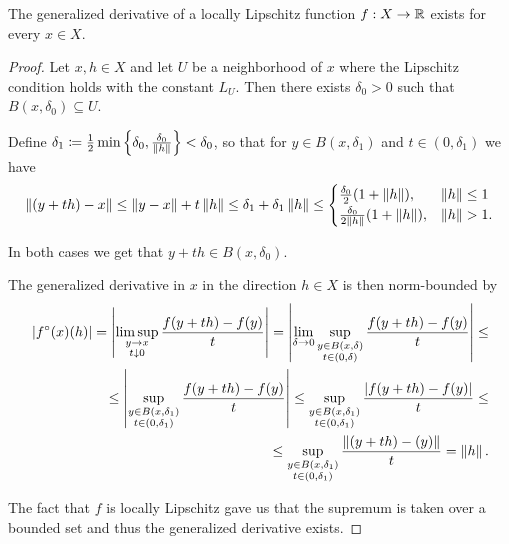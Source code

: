 \begin{proposition}\label{thm:clarke_derivative_exists}
  The generalized derivative of a locally Lipschitz function $f: X \to \mathbb{R}$ exists for every $x \in X$.
\end{proposition}
\begin{proof}
  Let $x, h \in X$ and let $U$ be a neighborhood of $x$ where the Lipschitz condition holds with the constant $L_U$. Then there exists $\delta_0 > 0$ such that $B(x, \delta_0) \subseteq U$.

  Define $\delta_1 \coloneqq \frac 1 2 \min \left\{\delta_0, \frac {\delta_0} {\left\Vert h \right\Vert} \right\} < \delta_0$, so that for $y \in B(x, \delta_1)$ and $t \in (0, \delta_1)$ we have
  \begin{align*}
    \left\Vert (y + th) - x \right\Vert
    \leq
    \left\Vert y - x \right\Vert + t \left\Vert h \right\Vert
    \leq
    \delta_1 + \delta_1 \left\Vert h \right\Vert
    \leq
    \begin{cases}
      \frac {\delta_0} 2 (1 + \left\Vert h \right\Vert), &\left\Vert h \right\Vert \leq 1 \\
      \frac {\delta_0} {2 \left\Vert h \right\Vert} (1 + \left\Vert h \right\Vert), &\left\Vert h \right\Vert > 1.
    \end{cases}
  \end{align*}

  In both cases we get that $y + th \in B(x, \delta_0)$.

  The generalized derivative in $x$ in the direction $h \in X$ is then norm-bounded by
  \begin{align*}
    \left\vert f^\circ(x)(h) \right\vert
    =
    \left\vert \limsup_{\substack{y \to x \\ t \downarrow 0}} \frac {f(y + th) - f(y)} t \right\vert
    =
    \left\vert \lim_{\delta \to 0} \sup_{\substack{y \in B(x, \delta) \\ t \in (0, \delta)}} \frac {f(y + th) - f(y)} t \right\vert
    \leq \\ \leq
    \left\vert \sup_{\substack{y \in B(x, \delta_1) \\ t \in (0, \delta_1)}} \frac {f(y + th) - f(y)} t \right\vert
    \leq
    \sup_{\substack{y \in B(x, \delta_1) \\ t \in (0, \delta_1)}} \frac {\left\vert f(y + th) - f(y) \right\vert} t
    \leq \\ \leq
    \sup_{\substack{y \in B(x, \delta_1) \\ t \in (0, \delta_1)}} \frac {\left\Vert (y + th) - (y) \right\Vert} t
    =
    \left\Vert h \right\Vert.
  \end{align*}

  The fact that $f$ is locally Lipschitz gave us that the supremum is taken over a bounded set and thus the generalized derivative exists.
\end{proof}
